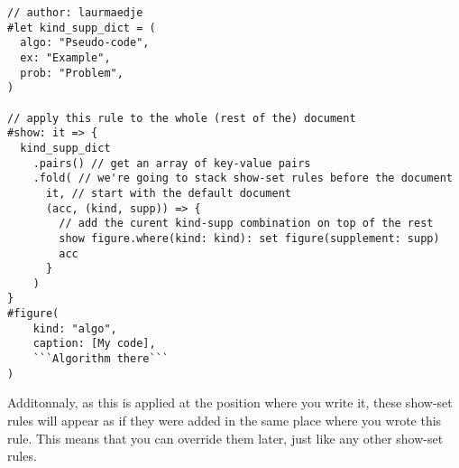 \begin{verbatim}
// author: laurmaedje
#let kind_supp_dict = (
  algo: "Pseudo-code",
  ex: "Example",
  prob: "Problem",
)

// apply this rule to the whole (rest of the) document
#show: it => {
  kind_supp_dict
    .pairs() // get an array of key-value pairs
    .fold( // we're going to stack show-set rules before the document
      it, // start with the default document
      (acc, (kind, supp)) => {
        // add the curent kind-supp combination on top of the rest
        show figure.where(kind: kind): set figure(supplement: supp)
        acc
      }
    )
}
#figure(
    kind: "algo",
    caption: [My code],
    ```Algorithm there```
)
\end{verbatim}

\pandocbounded{}

Additonnaly, as this is applied at the position where you write it,
these show-set rules will appear as if they were added in the same place
where you wrote this rule. This means that you can override them later,
just like any other show-set rules.
